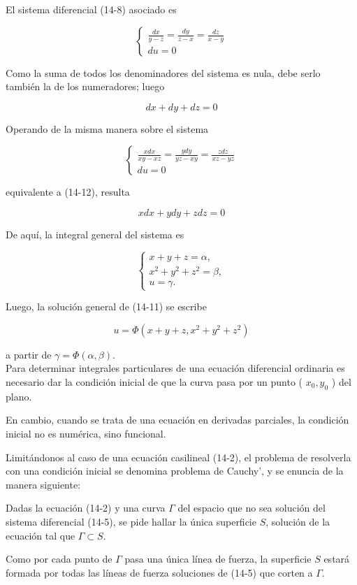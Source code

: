 \documentclass[10pt]{article}
\theoremstyle{plain}
\theoremstyle{definition}
\theoremstyle{remark}
\begin{document}
El sistema diferencial (14-8) asociado es

\[
\left\{\begin{array}{l}
\frac{d x}{y-z}=\frac{d y}{z-x}=\frac{d z}{x-y}  \tag{14-12}\\
d u=0
\end{array}\right.
\]

Como la suma de todos los denominadores del sistema es nula, debe serlo también la de los numeradores; luego

$$
d x+d y+d z=0
$$

Operando de la misma manera sobre el sistema


$$
\left\{\begin{array}{l}
\frac{x d x}{x y-x z}=\frac{y d y}{y z-x y}=\frac{z d z}{x z-y z} \\
d u=0
\end{array}\right.
$$

equivalente a (14-12), resulta

$$
x d x+y d y+z d z=0
$$

De aquí, la integral general del sistema es

$$
\left\{\begin{array}{l}
x+y+z=\alpha, \\
x^{2}+y^{2}+z^{2}=\beta, \\
u=\gamma .
\end{array}\right.
$$

Luego, la solución general de (14-11) se escribe

$$
u=\Phi\left(x+y+z, x^{2}+y^{2}+z^{2}\right)
$$

a partir de $\gamma=\Phi(\alpha, \beta)$.\\
Para determinar integrales particulares de una ecuación diferencial ordinaria es necesario dar la condición inicial de que la curva pasa por un punto ( $x_{0}, y_{0}$ ) del plano.

En cambio, cuando se trata de una ecuación en derivadas parciales, la condición inicial no es numérica, sino funcional.

Limitándonos al caso de una ecuación casilineal (14-2), el problema de resolverla con una condición inicial se denomina problema de Cauchy', y se enuncia de la manera siguiente:

Dadas la ecuación (14-2) y una curva $\Gamma$ del espacio que no sea solución del sistema diferencial (14-5), se pide hallar la única superficie $S$, solución de la ecuación tal que $\Gamma \subset S$.

Como por cada punto de $\Gamma$ pasa una única línea de fuerza, la superficie $S$ estará formada por todas las líneas de fuerza soluciones de (14-5) que corten a $\Gamma$.
\end{document}
